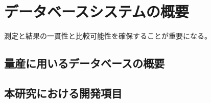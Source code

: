 \chapter{データベースシステムの概要}

測定と結果の一貫性と比較可能性を確保することが重要になる。

\section{量産に用いるデータベースの概要}

\section{本研究における開発項目}

\newpage

